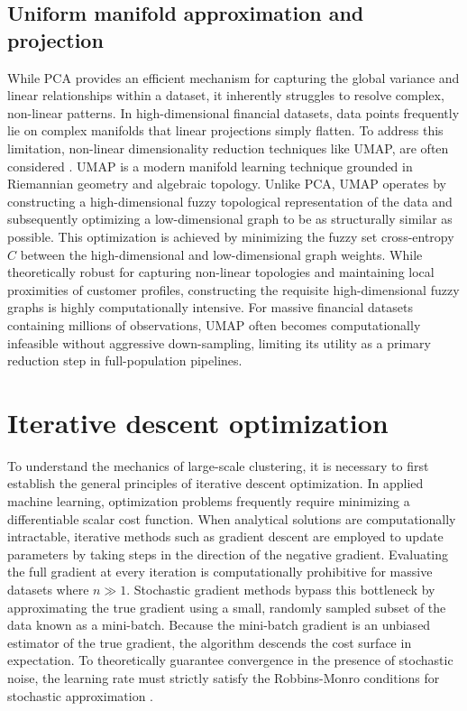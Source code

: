         \subsection{Uniform manifold approximation and projection}
        \label{subsec:umap}
        While PCA provides an efficient mechanism for capturing the global variance and linear relationships within a dataset, it inherently struggles to resolve complex, non-linear patterns.
        In high-dimensional financial datasets, data points frequently lie on complex manifolds that linear projections simply flatten.
        To address this limitation, non-linear dimensionality reduction techniques like UMAP, are often considered \cite{mcinnes_umap_2020}.
        UMAP is a modern manifold learning technique grounded in Riemannian geometry and algebraic topology.
        Unlike PCA, UMAP operates by constructing a high-dimensional fuzzy topological representation of the data and subsequently optimizing a low-dimensional graph to be as structurally similar as possible.
        This optimization is achieved by minimizing the fuzzy set cross-entropy $C$ between the high-dimensional and low-dimensional graph weights.
        While theoretically robust for capturing non-linear topologies and maintaining local proximities of customer profiles, constructing the requisite high-dimensional fuzzy graphs is highly computationally intensive.
        For massive financial datasets containing millions of observations, UMAP often becomes computationally infeasible without aggressive down-sampling, limiting its utility as a primary reduction step in full-population pipelines.
        
    \section{Iterative descent optimization}
    \label{sec:descent_optimization}
    To understand the mechanics of large-scale clustering, it is necessary to first establish the general principles of iterative descent optimization.
    In applied machine learning, optimization problems frequently require minimizing a differentiable scalar cost function.
    When analytical solutions are computationally intractable, iterative methods such as gradient descent are employed to update parameters by taking steps in the direction of the negative gradient.
    Evaluating the full gradient at every iteration is computationally prohibitive for massive datasets where $n \gg 1$.
    Stochastic gradient methods bypass this bottleneck by approximating the true gradient using a small, randomly sampled subset of the data known as a mini-batch.
    Because the mini-batch gradient is an unbiased estimator of the true gradient, the algorithm descends the cost surface in expectation.
    To theoretically guarantee convergence in the presence of stochastic noise, the learning rate must strictly satisfy the Robbins-Monro conditions for stochastic approximation \cite{robbins_stochastic_1951}.
    
